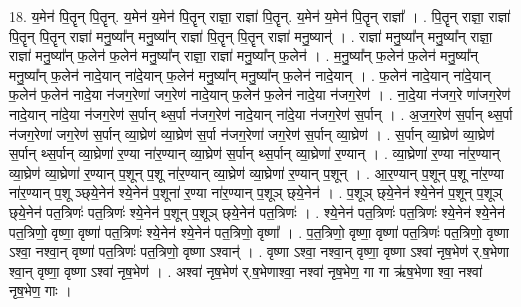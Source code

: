 \documentclass[17pt]{extarticle}
\begin{document}
18. य॒मेन॑ पि॒तॄन् पि॒तॄन्. य॒मेन॑ य॒मेन॑ पि॒तॄन् राज्ञा॒ राज्ञा॑ पि॒तॄन्. य॒मेन॑ य॒मेन॑ पि॒तॄन् राज्ञा᳚ । . पि॒तॄन् राज्ञा॒ राज्ञा॑ पि॒तॄन् पि॒तॄन् राज्ञा॑ मनु॒ष्या᳚न् मनु॒ष्या᳚न् राज्ञा॑ पि॒तॄन् पि॒तॄन् राज्ञा॑ मनु॒ष्यान्॑ । . राज्ञा॑ मनु॒ष्या᳚न् मनु॒ष्या᳚न् राज्ञा॒ राज्ञा॑ मनु॒ष्या᳚न् फ॒लेन॑ फ॒लेन॑ मनु॒ष्या᳚न् राज्ञा॒ राज्ञा॑ मनु॒ष्या᳚न् फ॒लेन॑ । . म॒नु॒ष्या᳚न् फ॒लेन॑ फ॒लेन॑ मनु॒ष्या᳚न् मनु॒ष्या᳚न् फ॒लेन॑ नादे॒यान् ना॑दे॒यान् फ॒लेन॑ मनु॒ष्या᳚न् मनु॒ष्या᳚न् फ॒लेन॑ नादे॒यान् । . फ॒लेन॑ नादे॒यान् ना॑दे॒यान् फ॒लेन॑ फ॒लेन॑ नादे॒या न॑जग॒रेणा॑ जग॒रेण॑ नादे॒यान् फ॒लेन॑ फ॒लेन॑ नादे॒या न॑जग॒रेण॑ । . ना॒दे॒या न॑जग॒रे णा॑जग॒रेण॑ नादे॒यान् ना॑दे॒या न॑जग॒रेण॑ स॒र्पान् थ्स॒र्पा न॑जग॒रेण॑ नादे॒यान् ना॑दे॒या न॑जग॒रेण॑ स॒र्पान् । . अ॒ज॒ग॒रेण॑ स॒र्पान् थ्स॒र्पा न॑जग॒रेणा॑ जग॒रेण॑ स॒र्पान् व्या॒घ्रेण॑ व्या॒घ्रेण॑ स॒र्पा न॑जग॒रेणा॑ जग॒रेण॑ स॒र्पान् व्या॒घ्रेण॑ । . स॒र्पान् व्या॒घ्रेण॑ व्या॒घ्रेण॑ स॒र्पान् थ्स॒र्पान् व्या॒घ्रेणा॑ र॒ण्या ना॑र॒ण्यान् व्या॒घ्रेण॑ स॒र्पान् थ्स॒र्पान् व्या॒घ्रेणा॑ र॒ण्यान् । . व्या॒घ्रेणा॑ र॒ण्या ना॑र॒ण्यान् व्या॒घ्रेण॑ व्या॒घ्रेणा॑ र॒ण्यान् प॒शून् प॒शू ना॑र॒ण्यान् व्या॒घ्रेण॑ व्या॒घ्रेणा॑ र॒ण्यान् प॒शून् । . आ॒र॒ण्यान् प॒शून् प॒शू ना॑र॒ण्या ना॑र॒ण्यान् प॒शू ञ्छ्‌ये॒नेन॑ श्ये॒नेन॑ प॒शूना॑ र॒ण्या ना॑र॒ण्यान् प॒शूञ् छ्‌ये॒नेन॑ । . प॒शूञ् छ्‌ये॒नेन॑ श्ये॒नेन॑ प॒शून् प॒शूञ् छ्‌ये॒नेन॑ पत॒त्रिणः॑ पत॒त्रिणः॑ श्ये॒नेन॑ प॒शून् प॒शूञ् छ्‌ये॒नेन॑ पत॒त्रिणः॑ । . श्ये॒नेन॑ पत॒त्रिणः॑ पत॒त्रिणः॑ श्ये॒नेन॑ श्ये॒नेन॑ पत॒त्रिणो॒ वृष्णा॒ वृष्णा॑ पत॒त्रिणः॑ श्ये॒नेन॑ श्ये॒नेन॑ पत॒त्रिणो॒ वृष्णा᳚ । . प॒त॒त्रिणो॒ वृष्णा॒ वृष्णा॑ पत॒त्रिणः॑ पत॒त्रिणो॒ वृष्णा ऽश्वा॒ नश्वा॒न् वृष्णा॑ पत॒त्रिणः॑ पत॒त्रिणो॒ वृष्णा ऽश्वान्॑ । . वृष्णा ऽश्वा॒ नश्वा॒न् वृष्णा॒ वृष्णा ऽश्वा॑ नृष॒भेण॑ र्.ष॒भेणा श्वा॒न् वृष्णा॒ वृष्णा ऽश्वा॑ नृष॒भेण॑ । . अश्वा॑ नृष॒भेण॑ र्.ष॒भेणाश्वा॒ नश्वा॑ नृष॒भेण॒ गा गा ऋ॑ष॒भेणा श्वा॒ नश्वा॑ नृष॒भेण॒ गाः । \newline
\end{document}
